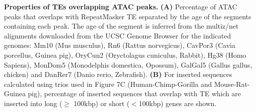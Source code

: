 \textbf{Properties of TEs overlapping ATAC peaks.} 
\textbf{(A)} Percentage of ATAC peaks that overlaps with RepeatMasker TE separated by the age of the segments containing each peak. The age of the segment is inferred from the multiz/net alignments downloaded from the UCSC Genome Browser for the indicated genomes: Mm10 (Mus musculus), Rn6 (Rattus norvegicus), CavPor3 (Cavia porcellus, Guinea pig), OryCun2 (Oryctolagus cuniculus, Rabbit), Hg38 (Homo Sapiens), MonDom5 (Monodelphis domestica, Opossum), GalGal5 (Gallus gallus, chicken) and DanRer7 (Danio rerio, Zebrafish). 
\textbf{(B)} For inserted sequences calculated using trios used in Figure 7C (Human-Chimp-Gorilla and Mouse-Rat-Guinea pig), percentage of inserted sequences that overlap with TE which are inserted into long ($\geq$ 100kbp) or short ($<$100kbp) genes are shown. 